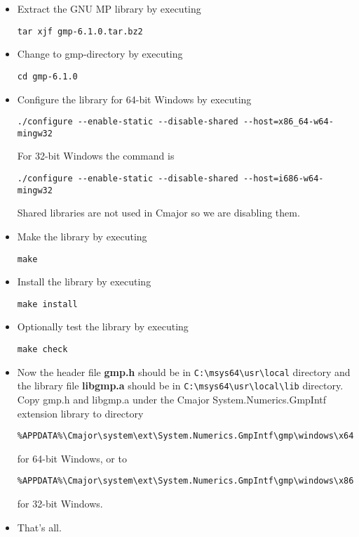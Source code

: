 \begin{itemize}
\item
Extract the GNU MP library by executing
\begin{verbatim}
tar xjf gmp-6.1.0.tar.bz2
\end{verbatim}

\item
Change to gmp-directory by executing
\begin{verbatim}
cd gmp-6.1.0
\end{verbatim}

\item
Configure the library for 64-bit Windows by executing
\begin{verbatim}
./configure --enable-static --disable-shared --host=x86_64-w64-mingw32
\end{verbatim}

For 32-bit Windows the command is
\begin{verbatim}
./configure --enable-static --disable-shared --host=i686-w64-mingw32
\end{verbatim}

Shared libraries are not used in Cmajor so we are disabling them.

\item
Make the library by executing
\begin{verbatim}
make
\end{verbatim}

\item
Install the library by executing
\begin{verbatim}
make install
\end{verbatim}

\item
Optionally test the library by executing
\begin{verbatim}
make check
\end{verbatim}

\item
Now the header file \textbf{gmp.h} should be in \verb|C:\msys64\usr\local| directory
and the library file \textbf{libgmp.a} should be in \verb|C:\msys64\usr\local\lib| directory.
Copy gmp.h and libgmp.a under the Cmajor System.Numerics.GmpIntf extension library to directory

\begin{verbatim}
%APPDATA%\Cmajor\system\ext\System.Numerics.GmpIntf\gmp\windows\x64
\end{verbatim}
for 64-bit Windows, or to
\begin{verbatim}
%APPDATA%\Cmajor\system\ext\System.Numerics.GmpIntf\gmp\windows\x86
\end{verbatim}
for 32-bit Windows.

\item
That's all.

\end{itemize}

